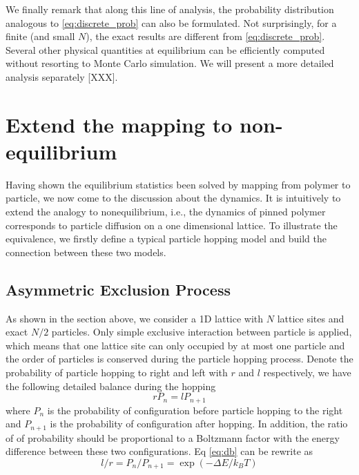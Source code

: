 \documentclass[aps,showpacs,twocolumn,floatfix,prx,superscriptaddress]{revtex4-1}
\begin{document}
We finally remark that along this line of analysis, the probability distribution
analogous to \eqref{eq:discrete_prob} can also be formulated. Not surprisingly,
for a finite (and small $N$), the exact results are different from
\eqref{eq:discrete_prob}. Several other physical quantities at equilibrium can
be efficiently computed without resorting to Monte Carlo simulation. We will
present a more detailed analysis separately [XXX].  

\section{Extend the mapping to non-equilibrium}
Having shown the equilibrium statistics been solved by mapping from polymer to
particle, we now come to the discussion about the dynamics. It is intuitively to
extend the analogy to nonequilibrium, i.e., the dynamics of pinned polymer
corresponds to particle diffusion on a one dimensional lattice. To illustrate
the equivalence, we firstly define a typical particle hopping model and build
the connection between these two models. 

\subsection{Asymmetric Exclusion Process}
\label{sec:asep}
As shown in the section above, we consider a 1D lattice with $N$ lattice sites and
exact $N/2$ particles. Only simple exclusive interaction between particle is
applied, which means that one lattice site can only occupied by at most one
particle and the order of particles is conserved during the particle hopping
process. Denote the probability of particle hopping to right and left with $r$
and $l$ respectively, we have the following detailed balance during the hopping
\begin{equation}
    r P_{n} = l P_{n+1} \label{eq:db}
\end{equation}
where $P_{n}$ is the probability of configuration before particle hopping to
the right and $P_{n+1}$ is the probability of configuration after hopping. 
In addition, the ratio of of probability should be proportional to a Boltzmann
factor with the energy difference between these two configurations. Eq
\eqref{eq:db} can be rewrite as 
\begin{equation}
    l / r = P_{n} / P_{n+1} = \exp{(-\Delta E / k_B T)}  \label{eq:r_divide_l}
\end{equation}
\end{document}

